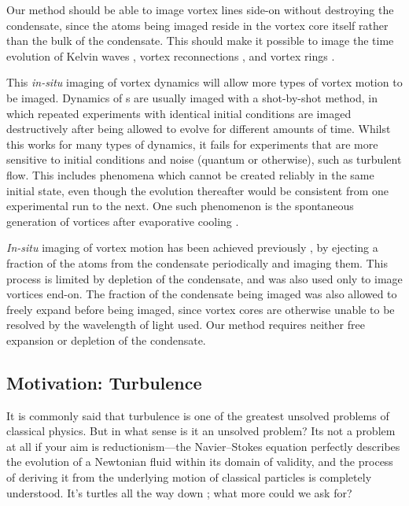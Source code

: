 Our method should be able to image vortex lines side-on without destroying the condensate, since the atoms being imaged reside in the vortex core itself rather than the bulk of the condensate. This should make it possible to image the time evolution of Kelvin waves \cite{bretin_quadrupole_2003}, vortex reconnections \cite{leadbeater_sound_2001}, and vortex rings \cite{anderson_watching_2001}.

This \emph{in-situ} imaging of vortex dynamics will allow more types of vortex motion to be imaged. Dynamics of \bec s are usually imaged with a shot-by-shot method, in which repeated experiments with identical initial conditions are imaged destructively after being allowed to evolve for different amounts of time. Whilst this works for many types of dynamics, it fails for experiments that are more sensitive to initial conditions and noise (quantum or otherwise), such as turbulent flow. This includes phenomena which cannot be created reliably in the same initial state, even though the evolution thereafter would be consistent from one experimental run to the next. One such phenomenon is the spontaneous generation of vortices after evaporative cooling \cite{weiler_spontaneous_2008}.

\emph{In-situ} imaging of vortex motion has been achieved previously \cite{freilich_real-time_2010}, by ejecting a fraction of the atoms from the condensate periodically and imaging them. This process is limited by depletion of the condensate, and was also used only to image vortices end-on. The fraction of the condensate being imaged was also allowed to freely expand before being imaged, since vortex cores are otherwise unable to be resolved by the wavelength of light used. Our method requires neither free expansion or depletion of the condensate.

\subsection{Motivation: Turbulence}

It is commonly said that turbulence is one of the greatest unsolved problems of classical physics. But in what sense is it an unsolved problem? Its not a problem at all if your aim is reductionism---the Navier--Stokes equation perfectly describes the evolution of a Newtonian fluid within its domain of validity, and the process of deriving it from the underlying motion of classical particles is completely understood. It's turtles all the way down \cite[p 1]{hawking_brief_1988}; what more could we ask for?

